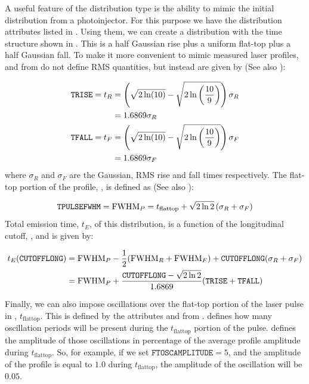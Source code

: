 A useful feature of the  distribution type is the ability to mimic the initial distribution
from a photoinjector. For this purpose we have the distribution attributes listed in .
Using them, we can create a distribution with the time structure
shown in . This is a half Gaussian rise plus a uniform flat-top plus a half Gaussian
fall. To make it more convenient to mimic measured laser profiles,  and  from
 do not define RMS quantities, but instead are given by (See also ):

\begin{align*}
  \keyword{TRISE} = t_{R} &= \left(\sqrt{2 \ln(10)} - \sqrt{2 \ln \left(\frac{10}{9} \right)} \right) \sigma_{R}\\
  & = 1.6869 \sigma_{R} \\
  \keyword{TFALL} = t_{F} &= \left(\sqrt{2 \ln(10)} - \sqrt{2 \ln \left(\frac{10}{9} \right)} \right) \sigma_{F}\\
  & = 1.6869 \sigma_{F}
\end{align*}
where $\sigma_{R}$ and $\sigma_{F}$ are the Gaussian, RMS rise and fall times respectively. The flat-top portion
of the profile, , is defined as (See also ):

\begin{equation*}
  \keyword{TPULSEFWHM} = \mathrm{FWHM}_{P} = t_\mathrm{flattop} + \sqrt{2 \ln 2} \left( \sigma_{R} + \sigma_{F} \right)
\end{equation*}
Total emission time, $t_{E}$, of this distribution, is a function of the longitudinal cutoff,
 , and is given by:

\begin{align*}
  t_{E}(\keyword{CUTOFFLONG}) &= \mathrm{FWHM}_{P} - \frac{1}{2} (\mathrm{FWHM}_{R} + \mathrm{FWHM}_{F})
  + \keyword{CUTOFFLONG} (\sigma_{R} + \sigma_{F}) \\
  &= \mathrm{FWHM}_{P} + \frac{\keyword{CUTOFFLONG} - \sqrt{2 \ln 2}}{1.6869} (\keyword{TRISE} + \keyword{TFALL})
\end{align*}

Finally, we can also impose oscillations over the flat-top portion of the laser pulse in ,
$t_\mathrm{flattop}$. This is defined by the attributes  and  from
.  defines how many oscillation periods will be present
during the $t_\mathrm{flattop}$ portion of the pulse.  defines the amplitude of those
oscillations in percentage of the average profile amplitude during $t_\mathrm{flattop}$. So, for example, if we
set $\texttt{FTOSCAMPLITUDE} = 5$, and the amplitude of the profile is equal to $1.0$ during $t_\mathrm{flattop}$,
the amplitude of the oscillation will be $0.05$.

